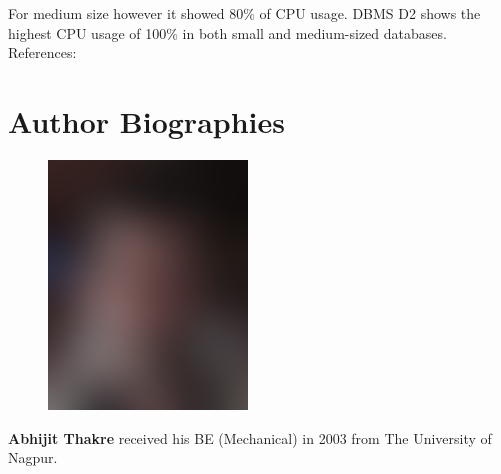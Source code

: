 \documentclass[9pt,twocolumn,twoside]{../../styles/osajnl}
\begin{document}
For medium size however it showed 80\% of CPU usage.
DBMS D2 shows the highest CPU usage of 100\% in both small and medium-sized databases. References: \cite{www-benchmark}


\newpage



 
\section*{Author Biographies}
\begingroup
\setlength\intextsep{0pt}
\begin{minipage}[t][3.2cm][t]{1.0\columnwidth} %
  \begin{figure}
    \includegraphics[width=0.25\columnwidth]{images/john_smith.eps}
  \end{figure}
  \noindent
  {\bfseries Abhijit Thakre} received his BE (Mechanical) in 2003 from
  The University of Nagpur.
\end{minipage}
\endgroup


\appendix
\end{document}
